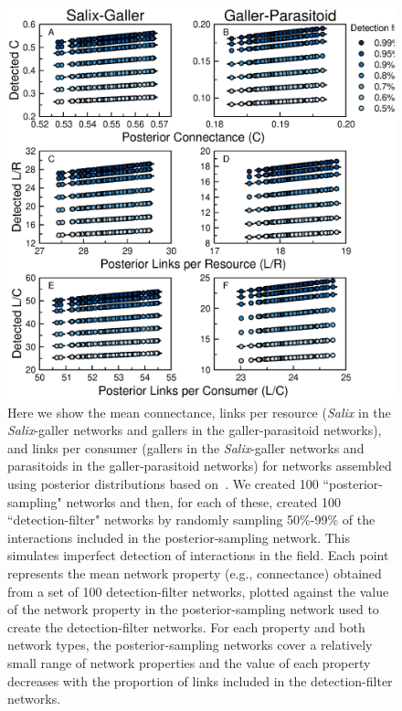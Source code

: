 \documentclass[12pt]{article}
\begin{document}
    \begin{figure}[ht]
    \caption{Here we show the mean connectance, links per resource (\emph{Salix} in the \emph{Salix}-galler networks and gallers in the galler-parasitoid networks), and links per consumer (gallers in the \emph{Salix}-galler networks and parasitoids in the galler-parasitoid networks) for networks assembled using posterior distributions based on~\citet{Barbour2016,Barbour2016Dryad}. We created 100 ``posterior-sampling" networks and then, for each of these, created 100 ``detection-filter" networks by randomly sampling 50\%-99\% of the interactions included in the posterior-sampling network. This simulates imperfect detection of interactions in the field. Each point represents the mean network property (e.g., connectance) obtained from a set of 100 detection-filter networks, plotted against the value of the network property in the posterior-sampling network used to create the detection-filter networks. For each property and both network types, the posterior-sampling networks cover a relatively small range of network properties and the value of each property decreases with the proportion of links included in the detection-filter networks.}
    \label{posterior_webs}    
    \includegraphics[width=.8\textwidth]{Figures/Salix_Galler_posterior_properties.eps}
    \end{figure}

\end{document}
